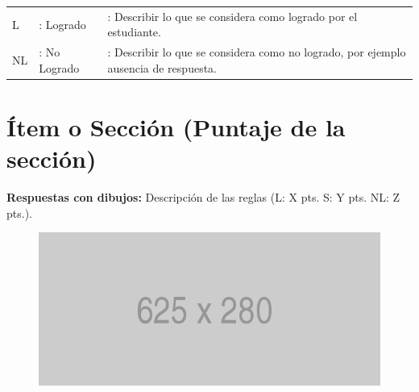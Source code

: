 \documentclass{exam}
\begin{document}
\begin{table}[H]
    {\small
    \begin{tabular}{lll}
        L  & : Logrado    & : Describir lo que se considera como logrado por el estudiante. \\
        NL & : No Logrado & : Describir lo que se considera como no logrado, por ejemplo ausencia de respuesta.
    \end{tabular}}
\end{table}

\vspace{-7mm}
\section{\textbf{\'Item o Secci\'on (Puntaje de la secci\'on)}}
\noindent
\textbf{Respuestas con dibujos: } Descripci{\'o}n de las reglas (L: X pts. S: Y pts. NL: Z pts.).

\begin{figure}[H]
    \centering
    \includegraphics{base/placeholder.png}
    \label{fig:1}
\end{figure}
\end{document}
